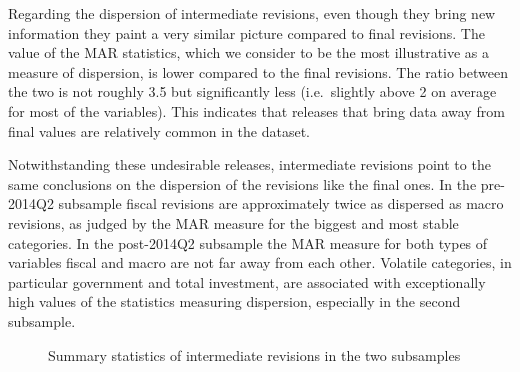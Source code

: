 \documentclass[
  letterpaper,
  authoryear,
  preprint,
  3p]{elsarticle}
\begin{document}
Regarding the dispersion of intermediate revisions, even though they
bring new information they paint a very similar picture compared to
final revisions. The value of the MAR statistics, which we consider to
be the most illustrative as a measure of dispersion, is lower compared
to the final revisions. The ratio between the two is not roughly 3.5 but
significantly less (i.e.~slightly above 2 on average for most of the
variables). This indicates that releases that bring data away from final
values are relatively common in the dataset.

Notwithstanding these undesirable releases, intermediate revisions point
to the same conclusions on the dispersion of the revisions like the
final ones. In the pre-2014Q2 subsample fiscal revisions are
approximately twice as dispersed as macro revisions, as judged by the
MAR measure for the biggest and most stable categories. In the
post-2014Q2 subsample the MAR measure for both types of variables fiscal
and macro are not far away from each other. Volatile categories, in
particular government and total investment, are associated with
exceptionally high values of the statistics measuring dispersion,
especially in the second subsample.

\begin{figure}

\begin{minipage}[t]{\linewidth}

{\centering 


}

\end{minipage}%
\newline
\begin{minipage}[t]{\linewidth}

{\centering 


}

\end{minipage}%

\caption{\label{fig-inRevGItems_prepost2014}Summary statistics of
intermediate revisions in the two subsamples}

\end{figure}
\end{document}
